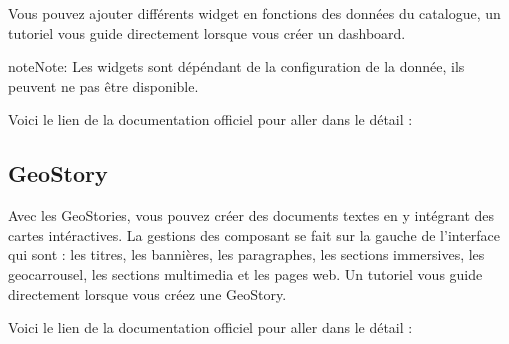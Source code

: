 \documentclass[letterpaper,10pt,french]{sphinxmanual}
\let\sphinxpxdimen\pdfpxdimen\else\newdimen\sphinxpxdimen
\begin{document}
\sphinxAtStartPar
Vous pouvez ajouter différents widget en fonctions des données du catalogue, un tutoriel vous guide directement lorsque vous créer un dashboard.

\begin{sphinxadmonition}{note}{Note:}
\sphinxAtStartPar
Les widgets sont dépéndant de la configuration de la donnée, ils peuvent ne pas être disponible.
\end{sphinxadmonition}

\sphinxAtStartPar
Voici le lien de la documentation officiel pour aller dans le détail :

\sphinxAtStartPar
{}


\subsection{GeoStory}
\label{\detokenize{doc_user/application:geostory}}
\noindent{\hspace*{\fill}\sphinxincludegraphics[width=600\sphinxpxdimen]{{app_geostory}.png}\hspace*{\fill}}

\sphinxAtStartPar
Avec les GeoStories, vous pouvez créer des documents textes en y intégrant des cartes intéractives. La gestions des composant se fait sur la gauche
de l’interface qui sont : les titres, les bannières, les paragraphes, les sections immersives, les geocarrousel, les sections multimedia et les pages web.
Un tutoriel vous guide directement lorsque vous créez une GeoStory.

\sphinxAtStartPar
Voici le lien de la documentation officiel pour aller dans le détail :

\sphinxAtStartPar
{}

\sphinxstepscope
\end{document}
